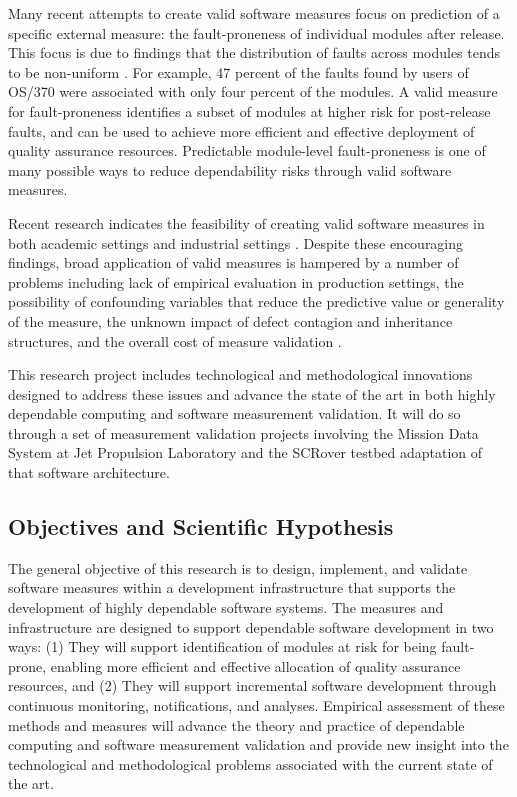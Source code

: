 Many recent attempts to create valid software measures focus on prediction
of a specific external measure: the fault-proneness of 
individual modules after release. This focus is due to findings that the
distribution of faults across modules tends to be non-uniform
\cite{Myers79,Fenton00b,Moller93}.  For example, 47 percent of the faults
found by users of OS/370 were associated with only four percent of the
modules. A valid measure for fault-proneness identifies a subset of modules
at higher risk for post-release faults, and can be used to achieve more
efficient and effective deployment of quality assurance resources.
Predictable module-level fault-proneness is one of many possible ways to
reduce dependability risks through valid software measures.

Recent research indicates the feasibility of creating valid software
measures in both academic settings
\cite{Basili96,Emam00,Pai01,Cartwright98,Daly96} and industrial settings
\cite{Briand01,Binkley98b,Mayrand96,Hudepohl96}.  Despite these
encouraging findings, broad application of valid measures is hampered by a
number of problems 
including lack of empirical evaluation in production settings, the
possibility of confounding variables that reduce the predictive value or
generality of the measure, the unknown impact of defect contagion and
inheritance structures, and the overall cost of measure validation \cite{Benlarbi99,Emam01,Biyani98,Fenton00b}.

This research project includes technological and methodological innovations 
designed to address these issues and advance the state of the art in both
highly dependable computing and software measurement validation. It will do 
so through a set of measurement validation projects involving the Mission
Data System at Jet Propulsion Laboratory and the SCRover testbed adaptation of that
software architecture. 


\subsection{Objectives and Scientific Hypothesis}

The general objective of this research is to design, implement, and
validate software measures within a development infrastructure that
supports the development of highly dependable software systems. The
measures and infrastructure are designed to support dependable software
development in two ways: (1) They will support identification of modules at
risk for being fault-prone, enabling more efficient and effective
allocation of quality assurance resources, and (2) They will support
incremental software development through continuous monitoring,
notifications, and analyses.  Empirical assessment of these methods and
measures will advance the theory and practice of dependable computing and
software measurement validation and provide new insight into the
technological and methodological problems associated with the current state
of the art.

